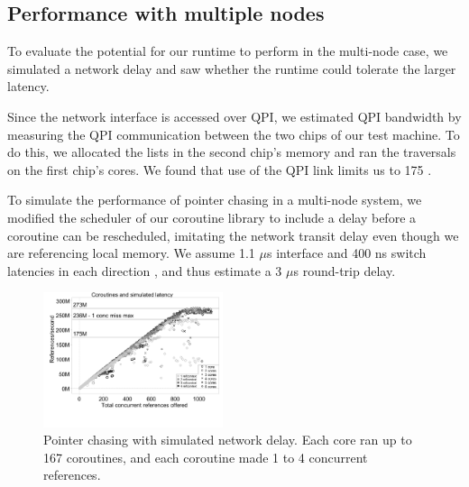 \documentclass[10pt,nocopyrightspace,preprint]{sigplanconf}
\begin{document}
\subsection{Performance with multiple nodes}

To evaluate the potential for our runtime to perform in the multi-node case, we simulated a network delay and saw whether the runtime could tolerate the larger latency. 

Since the network interface is accessed over QPI, we estimated QPI bandwidth by measuring the QPI communication between the two chips of our test machine. To do this, we allocated the lists in the second chip's memory and ran the traversals on the first chip's cores. We found that use of the QPI link limits us to 175 \mrps.


To simulate the performance of pointer chasing in a multi-node system,
we modified the scheduler of our coroutine library to include a delay
before a coroutine can be rescheduled, imitating the network transit
delay even though we are referencing local memory. We assume 1.1
$\mu$s interface and 400 ns switch latencies in each direction
\cite{infiniband, mellanox:site}, and thus estimate a 3 $\mu$s round-trip
delay.

\begin{figure}[h]
  \begin{center}
    \includegraphics[width=0.47\textwidth]{figures/multi-green-delay7800-edited.pdf}
  \end{center}
  \vspace{-0.3in}
  \caption{Pointer chasing with simulated network delay. Each core ran up to 167 coroutines, and each coroutine made 1 to 4 concurrent references.}
  \label{fig:network-delay}
\end{figure}
\end{document}
